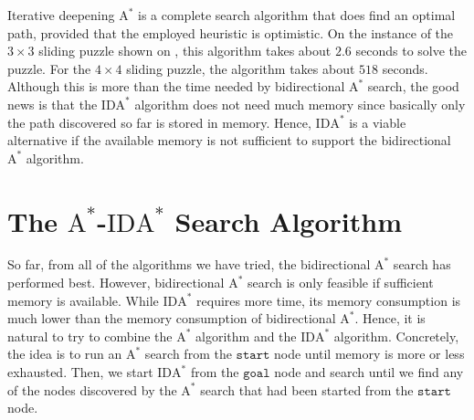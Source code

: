 Iterative deepening $\mathrm{A}^*$ is a complete search algorithm that does find an optimal path, provided that the employed heuristic
is optimistic.  On the instance of the $3 \times 3$ sliding puzzle shown on , this
algorithm takes about $2.6$ seconds to solve the puzzle.  For the $4 \times 4$ sliding puzzle, the algorithm
takes about $518$ seconds.  Although this is more than the time needed by bidirectional $\mathrm{A}^*$ search,
the good news is that the $\mathrm{IDA}^*$ algorithm does not need much memory since basically only the path
discovered so far is stored in memory.  Hence, $\mathrm{IDA}^*$ is a viable alternative if the available memory
is not sufficient to support the bidirectional $\mathrm{A}^*$ algorithm.

\section{The $\mathrm{A}^*$-$\mathrm{IDA}^*$ Search Algorithm}
So far, from all of the algorithms we have tried, the bidirectional $\mathrm{A}^*$ search has performed best.  However,
bidirectional $\mathrm{A}^*$ search is only feasible if sufficient memory is available.   While
$\mathrm{IDA}^*$ requires more time, its memory consumption is much lower than the memory consumption of
bidirectional $\mathrm{A}^*$.  Hence, it is natural to try to combine the $\mathrm{A}^*$ algorithm and the
$\mathrm{IDA}^*$ algorithm.  Concretely, the
idea is to run an $\mathrm{A}^*$ search from the $\mathtt{start}$ node until memory is more or less
exhausted.  Then, we start $\mathrm{IDA}^*$ from the $\mathtt{goal}$ node and search until we find any of the
nodes discovered by the $\mathrm{A}^*$ search that had been started from the $\mathtt{start}$ node.

